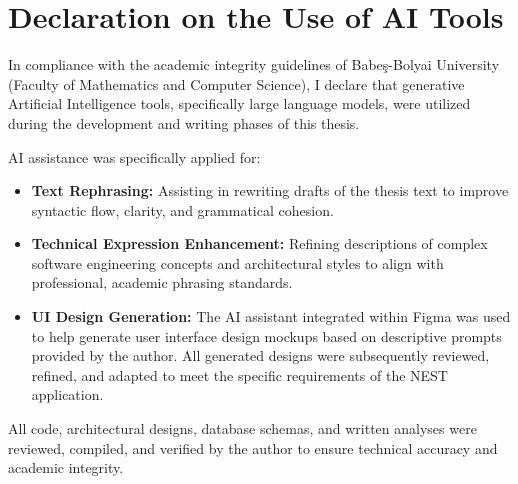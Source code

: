 \section{Declaration on the Use of AI Tools}
In compliance with the academic integrity guidelines of Babe\c{s}-Bolyai University (Faculty of Mathematics and Computer Science), I declare that generative Artificial Intelligence tools, specifically large language models, were utilized during the development and writing phases of this thesis. 

AI assistance was specifically applied for:
\begin{itemize}
    \item \textbf{Text Rephrasing:} Assisting in rewriting drafts of the thesis text to improve syntactic flow, clarity, and grammatical cohesion.
    \item \textbf{Technical Expression Enhancement:} Refining descriptions of complex software engineering concepts and architectural styles to align with professional, academic phrasing standards.
    \item \textbf{UI Design Generation:} The AI assistant integrated within Figma was used to help generate user interface design mockups based on descriptive prompts provided by the author. All generated designs were subsequently reviewed, refined, and adapted to meet the specific requirements of the NEST application.
\end{itemize}
All code, architectural designs, database schemas, and written analyses were reviewed, compiled, and verified by the author to ensure technical accuracy and academic integrity.